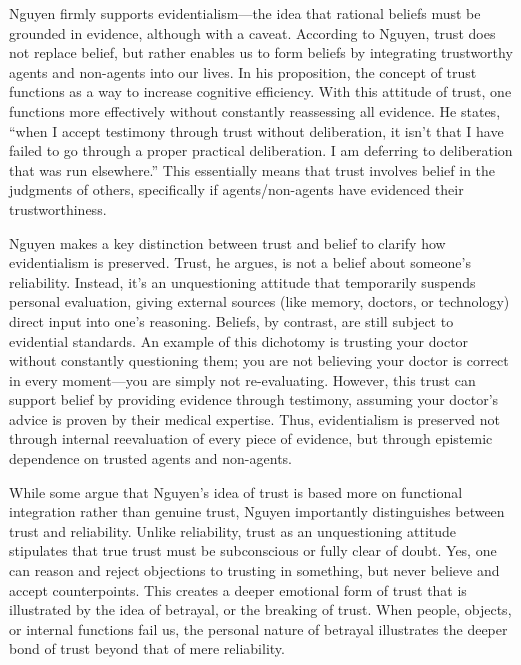 Nguyen firmly supports evidentialism—the idea that rational beliefs must be grounded in evidence, although with a caveat. According to Nguyen, trust does not replace belief, but rather enables us to form beliefs by integrating trustworthy agents and non-agents into our lives. In his proposition, the concept of trust functions as a way to increase cognitive efficiency. With this attitude of trust, one functions more effectively without constantly reassessing all evidence. He states, “when I accept testimony through trust without deliberation, it isn’t that I have failed to go through a proper practical deliberation. I am deferring to deliberation that was run elsewhere.” This essentially means that trust involves belief in the judgments of others, specifically if agents/non-agents have evidenced their trustworthiness.

Nguyen makes a key distinction between trust and belief to clarify how evidentialism is preserved. Trust, he argues, is not a belief about someone’s reliability. Instead, it’s an unquestioning attitude that temporarily suspends personal evaluation, giving external sources (like memory, doctors, or technology) direct input into one’s reasoning. Beliefs, by contrast, are still subject to evidential standards. An example of this dichotomy is trusting your doctor without constantly questioning them; you are not believing your doctor is correct in every moment—you are simply not re-evaluating. However, this trust can support belief by providing evidence through testimony, assuming your doctor’s advice is proven by their medical expertise. Thus, evidentialism is preserved not through internal reevaluation of every piece of evidence, but through epistemic dependence on trusted agents and non-agents.

While some argue that Nguyen’s idea of trust is based more on functional integration rather than genuine trust, Nguyen importantly distinguishes between trust and reliability. Unlike reliability, trust as an unquestioning attitude stipulates that true trust must be subconscious or fully clear of doubt. Yes, one can reason and reject objections to trusting in something, but never believe and accept counterpoints. This creates a deeper emotional form of trust that is illustrated by the idea of betrayal, or the breaking of trust. When people, objects, or internal functions fail us, the personal nature of betrayal illustrates the deeper bond of trust beyond that of mere reliability.

